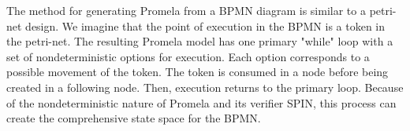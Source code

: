 The method for generating Promela from a BPMN diagram is similar to a petri-net design. We imagine that the point of execution in the BPMN is a token in the petri-net. The resulting Promela model has one primary "while" loop with a set of nondeterministic options for execution. Each option corresponds to a possible movement of the token. The token is consumed in a node before being created in a following node. Then, execution returns to the primary loop. Because of the nondeterministic nature of Promela and its verifier SPIN, this process can create the comprehensive state space for the BPMN.
